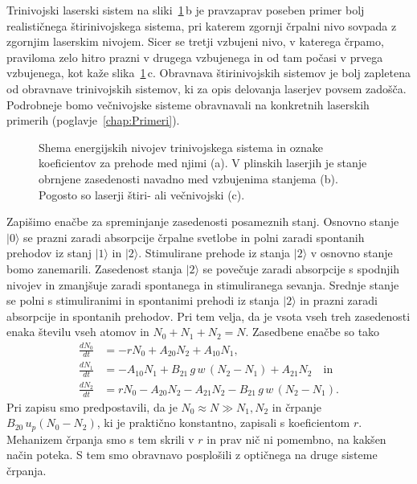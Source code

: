 \begin{remark}
Trinivojski laserski sistem na sliki~\ref{fig:3nivojski}\,b je pravzaprav 
poseben primer bolj realističnega štiri\-nivojskega sistema, 
pri katerem zgornji črpalni nivo sovpada z zgornjim laserskim nivojem. Sicer se tretji vzbujeni nivo, 
v katerega črpamo, praviloma zelo hitro prazni v drugega vzbujenega in od tam počasi v prvega vzbujenega, 
kot kaže slika~\ref{fig:3nivojski}\,c.
Obravnava štirinivojskih sistemov je bolj zapletena od obravnave trinivojskih sistemov, 
ki za opis delovanja laserjev povsem zadošča. Podrobneje bomo večnivojske sisteme 
obravnavali na konkretnih laserskih primerih (poglavje~\ref{chap:Primeri}).
\end{remark}

\begin{figure}[h]
\centering
\def\svgwidth{130truemm} 

\caption{Shema energijskih nivojev trinivojskega sistema in oznake koeficientov za prehode
med njimi (a). V plinskih laserjih je stanje obrnjene zasedenosti navadno med vzbujenima 
stanjema (b). Pogosto so laserji štiri- ali večnivojski (c).}
\label{fig:3nivojski}
\end{figure}
\pagebreak

Zapišimo enačbe za spreminjanje zasedenosti posameznih stanj. Osnovno stanje
$|0\rangle$ se prazni zaradi absorpcije črpalne svetlobe in polni zaradi
spontanih prehodov iz stanj $|1\rangle$ in $|2\rangle$. Stimulirane
prehode iz stanja $|2\rangle$ v osnovno stanje bomo zanemarili. Zasedenost stanja $|2\rangle$ se
povečuje zaradi absorpcije s spodnjih nivojev in zmanjšuje
zaradi spontanega in stimuliranega sevanja. Srednje stanje se polni
s stimuliranimi in spontanimi prehodi iz stanja $|2\rangle$ in prazni
zaradi absorpcije in spontanih prehodov.
Pri tem velja, da je vsota vseh treh zasedenosti enaka številu vseh atomov in $N_{0}+N_{1}+N_{2}=N$. 
Zasedbene enačbe so tako
\begin{align}
\frac{dN_{0}}{dt} & =  -rN_0+A_{20}N_{2}+A_{10}N_{1}, \label{4.39.1}\\
\frac{dN_{1}}{dt} & =  -A_{10}N_{1}+B_{21}\,g\,w\, (N_{2}-N_{1})+A_{21}N_{2} \label{4.39.2} \quad \mathrm{in}\\
\frac{dN_{2}}{dt} & =  rN_0-A_{20}N_{2}-A_{21}N_{2}-B_{21}\,g\,w\, (N_2-N_1).
\label{4.39}
\end{align}
Pri zapisu smo predpostavili, da je $N_0 \approx N \gg N_1, N_2$ in črpanje $B_{20}\, 
u_{p} (N_0-N_2)$, ki je praktično konstantno, zapisali s koeficientom $r$. Mehanizem črpanja 
smo s tem skrili v $r$ in prav nič ni pomembno, na kakšen način poteka.
S tem smo obravnavo posplošili z optičnega na druge sisteme črpanja. 

